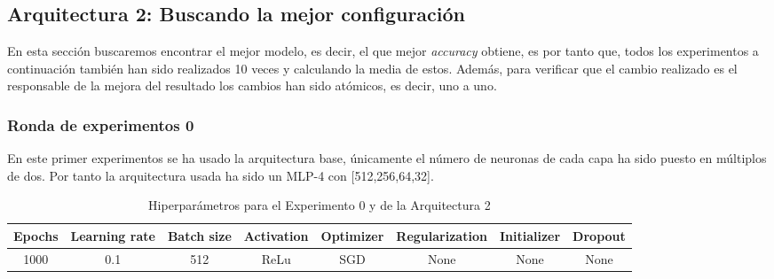 \documentclass{article}
\begin{document}
   
		\subsection{Arquitectura 2: Buscando la mejor configuración}

 En esta sección buscaremos encontrar el mejor modelo, es decir, el que mejor \textit{accuracy} obtiene, es por tanto que, todos los experimentos a continuación tambi\'en han sido realizados 10 veces y calculando la media de estos.
Además, para verificar que el cambio realizado es el responsable de la mejora del resultado los cambios han sido atómicos, es decir, uno a uno.

	\label{j-s-a0} %
		
		
		\subsubsection{Ronda de experimentos 0}
		\label{j-s-a0-e0} %
			En este primer experimentos se ha usado la arquitectura base, \'unicamente el n\'umero de neuronas de cada capa ha sido puesto en m\'ultiplos de dos. 
        Por tanto la arquitectura usada ha sido un MLP-4 con [512,256,64,32].
			
			\begin{table}[!h]
				\begin{center}
					\begin{tabular}{| c | c | c | c | c | c | c | c |}
						\textbf{Epochs} & \textbf{Learning rate} & \textbf{Batch size} & \textbf{Activation} & \textbf{Optimizer} & \textbf{Regularization} & \textbf{Initializer} & \textbf{Dropout}\\ \hline
						1000 & 0.1 & 512 & ReLu & SGD & None & None & None
					\end{tabular}
					\caption{Hiperpar\'ametros para el Experimento 0 y de la Arquitectura 2}
					\label{tab:hip-j-a0-e0}
				\end{center}
			\end{table}
			
\end{document}

